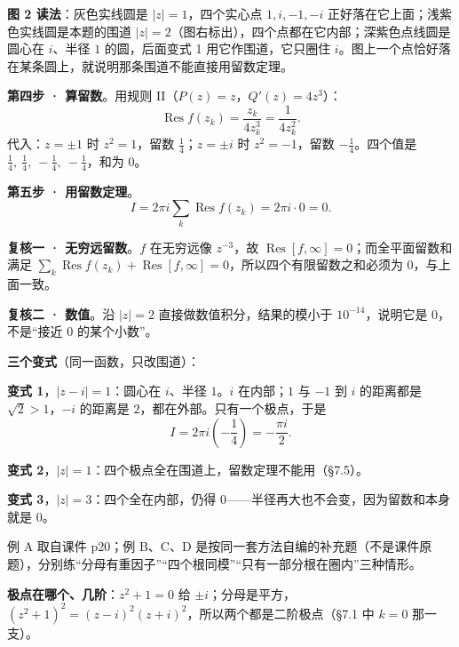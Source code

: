 \documentclass[11pt]{ctexart}
\renewcommand{\qbreak}{\needspace{0.32\textheight}}
\let\orighdr\hdr
\renewcommand{\hdr}[2]{\par\orighdr{#1}{#2}}
\begin{document}
\textbf{图 2 读法}：灰色实线圆是 $|z|=1$，四个实心点 $1,i,-1,-i$ 正好落在它上面；浅紫色实线圆是本题的围道 $|z|=2$（图右标出），四个点都在它内部；深紫色点线圆是圆心在 $i$、半径 $1$ 的圆，后面变式 1 用它作围道，它只圈住 $i$。图上一个点恰好落在某条圆上，就说明那条围道不能直接用留数定理。


\textbf{第四步 · 算留数}。用规则 II（$P(z)=z$，$Q'(z)=4z^{3}$）：
\[ \operatorname{Res}f(z_k)=\frac{z_k}{4z_k^{3}}=\frac{1}{4z_k^{2}} . \]
代入：$z=\pm1$ 时 $z^{2}=1$，留数 $\frac14$；$z=\pm i$ 时 $z^{2}=-1$，留数 $-\frac14$。四个值是 $\frac14,\ \frac14,\ -\frac14,\ -\frac14$，和为 $0$。

\textbf{第五步 · 用留数定理}。
\[ I=2\pi i\sum_k\operatorname{Res}f(z_k)=2\pi i\cdot0=0 . \]


\textbf{复核一 · 无穷远留数}。$f$ 在无穷远像 $z^{-3}$，故 $\operatorname{Res}[f,\infty]=0$；而全平面留数和满足 $\sum_k\operatorname{Res}f(z_k)+\operatorname{Res}[f,\infty]=0$，所以四个有限留数之和必须为 $0$，与上面一致。

\textbf{复核二 · 数值}。沿 $|z|=2$ 直接做数值积分，结果的模小于 $10^{-14}$，说明它是 $0$，不是“接近 $0$ 的某个小数”。

\textbf{三个变式}（同一函数，只改围道）：

\textbf{变式 1}，$|z-i|=1$：圆心在 $i$、半径 $1$。$i$ 在内部；$1$ 与 $-1$ 到 $i$ 的距离都是 $\sqrt2>1$，$-i$ 的距离是 $2$，都在外部。只有一个极点，于是
\[ I=2\pi i\left(-\frac14\right)=-\frac{\pi i}{2} . \]

\textbf{变式 2}，$|z|=1$：四个极点全在围道上，留数定理不能用（§7.5）。

\textbf{变式 3}，$|z|=3$：四个全在内部，仍得 $0$——半径再大也不会变，因为留数和本身就是 $0$。




例 A 取自课件 p20；例 B、C、D 是按同一套方法自编的补充题（不是课件原题），分别练“分母有重因子”“四个根同模”“只有一部分根在圈内”三种情形。

\qbreak
{}

\textbf{极点在哪个、几阶}：$z^{2}+1=0$ 给 $\pm i$；分母是平方，$(z^{2}+1)^{2}=(z-i)^{2}(z+i)^{2}$，所以两个都是二阶极点（§7.1 中 $k=0$ 那一支）。
\end{document}
